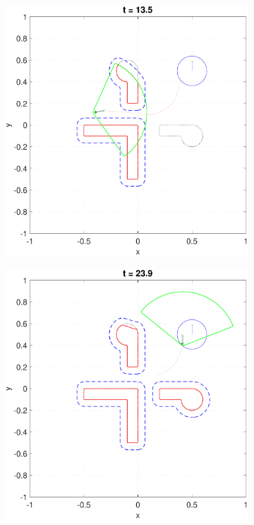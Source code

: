 \begin{figure}
  \begin{subfigure}[t]{0.49\columnwidth}\label{fig:5D3Dsim:3}
    \includegraphics[width=\columnwidth]{fig/P5D_Dubins/136}
    \caption{}
  \end{subfigure}
  \begin{subfigure}[t]{0.49\columnwidth}\label{fig:5D3Dsim:4}
    \includegraphics[width=\columnwidth]{fig/P5D_Dubins/240}
    \caption{}
  \end{subfigure}
  \caption{}
\end{figure}